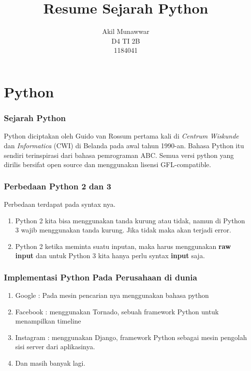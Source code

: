 \documentclass{article}
\begin{document}
\title{Resume Sejarah Python}
\author{Akil Munawwar \\ D4 TI 2B \\ 1184041}
\maketitle

\part{Python}
\section{Sejarah Python}
Python diciptakan oleh Guido van Rossum pertama kali di \textit{Centrum Wiskunde} dan \textit{Informatica} (CWI) di Belanda pada awal tahun 1990-an. Bahasa Python itu sendiri terinspirasi dari bahasa pemrograman ABC. Semua versi python yang dirilis bersifat open source dan menggunakan lisensi GFL-compatible.
\section{Perbedaan Python 2 dan 3}
Perbedaan terdapat pada syntax nya.
\begin{enumerate}
\item Python 2 kita bisa menggunakan tanda kurung atau tidak, namun di Python 3 wajib menggunakan tanda kurung. Jika tidak maka akan terjadi error.
\item Python 2 ketika meminta suatu inputan, maka harus menggunakan \textbf{raw input} dan untuk Python 3 kita hanya perlu syntax \textbf{input} saja.
\end{enumerate}
\newpage
\section{Implementasi Python Pada Perusahaan di dunia}
\begin{enumerate}
\item Google : Pada mesin pencarian nya menggunakan bahasa python
\item Facebook : menggunakan Tornado, sebuah framework Python untuk menampilkan timeline
\item Instagram : menggunakan Django, framework Python sebagai mesin pengolah sisi server dari aplikasinya.
\item Dan masih banyak lagi.
\end{enumerate}
\end{document}
